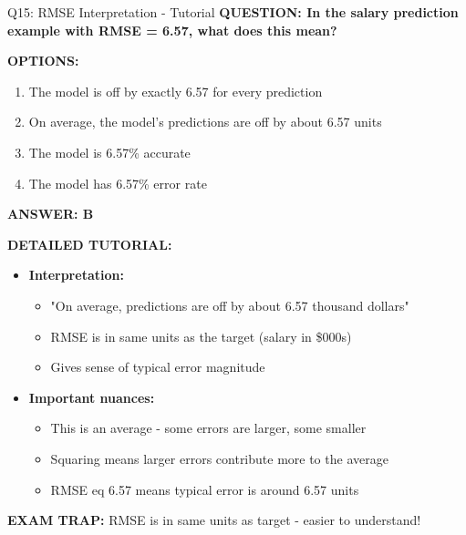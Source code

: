 \documentclass[8pt]{beamer}
\begin{document}
	\begin{frame}{Q15: RMSE Interpretation - Tutorial}
		\fontsize{6.5}{7.5}\selectfont
		\textbf{QUESTION: In the salary prediction example with RMSE = 6.57, what does this mean?}
		
		\vspace{0.1cm}
		\textbf{OPTIONS:}
		\begin{enumerate}
			\item The model is off by exactly 6.57 for every prediction
			\item On average, the model's predictions are off by about 6.57 units
			\item The model is 6.57\% accurate
			\item The model has 6.57\% error rate
		\end{enumerate}
		
		\vspace{0.1cm}
		\textcolor{myblue}{\textbf{ANSWER: B}}
		
		\vspace{0.1cm}
		\textbf{DETAILED TUTORIAL:}
		\begin{itemize}
			\item \textbf{Interpretation:}
			\begin{itemize}
				\item "On average, predictions are off by about 6.57 thousand dollars"
				\item RMSE is in same units as the target (salary in \$000s)
				\item Gives sense of typical error magnitude
			\end{itemize}
			\item \textbf{Important nuances:}
			\begin{itemize}
				\item This is an average - some errors are larger, some smaller
				\item Squaring means larger errors contribute more to the average
				\item RMSE eq 6.57 means typical error is around 6.57 units
			\end{itemize}
		\end{itemize}
		
		\textcolor{myred}{\textbf{EXAM TRAP:}} RMSE is in \textcolor{myblue}{same units as target} - easier to understand!
	\end{frame}
	
\end{document}
